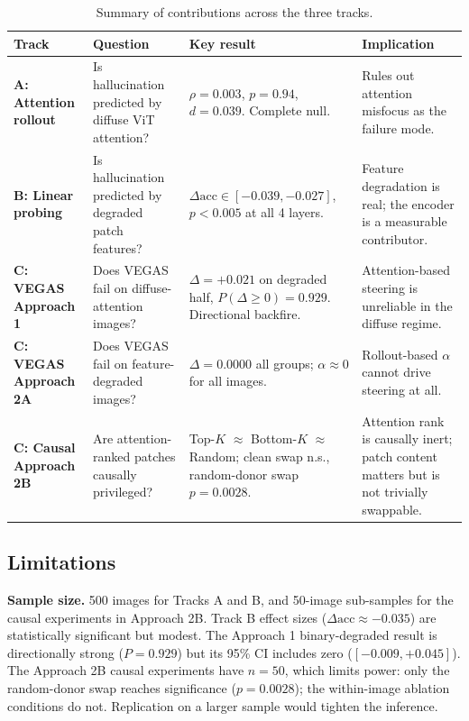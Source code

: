\documentclass[11pt]{article}
\begin{document}
\begin{table}[!ht]
\centering
\small
\caption{Summary of contributions across the three tracks.}
\label{tab:contributions}
\begin{tabular}{p{2.1cm}p{3.3cm}p{3.3cm}p{3.3cm}}
\toprule
\textbf{Track} & \textbf{Question} & \textbf{Key result} & \textbf{Implication} \\
\midrule
\textbf{A: Attention rollout}
  & Is hallucination predicted by diffuse ViT attention?
  & $\rho = 0.003$, $p = 0.94$, $d = 0.039$. Complete null.
  & Rules out attention misfocus as the failure mode. \\[4pt]
\textbf{B: Linear probing}
  & Is hallucination predicted by degraded patch features?
  & $\Delta\mathrm{acc} \in [-0.039, -0.027]$, $p < 0.005$ at all 4 layers.
  & Feature degradation is real; the encoder is a measurable contributor. \\[4pt]
\textbf{C: VEGAS Approach 1}
  & Does VEGAS fail on diffuse-attention images?
  & $\Delta = +0.021$ on degraded half, $P(\Delta \geq 0) = 0.929$. Directional
    backfire.
  & Attention-based steering is unreliable in the diffuse regime. \\[4pt]
\textbf{C: VEGAS Approach 2A}
  & Does VEGAS fail on feature-degraded images?
  & $\Delta = 0.0000$ all groups; $\alpha \approx 0$ for all images.
  & Rollout-based $\alpha$ cannot drive steering at all. \\[4pt]
\textbf{C: Causal Approach 2B}
  & Are attention-ranked patches causally privileged?
  & Top-$K$ $\approx$ Bottom-$K$ $\approx$ Random; clean swap n.s., random-donor swap
    $p = 0.0028$.
  & Attention rank is causally inert; patch content matters but is not trivially
    swappable. \\
\bottomrule
\end{tabular}
\end{table}

\subsection{Limitations}

\textbf{Sample size.} 500 images for Tracks A and B, and 50-image sub-samples for the
causal experiments in Approach 2B. Track B effect sizes
($\Delta\mathrm{acc} \approx -0.035$) are statistically significant but modest. The
Approach 1 binary-degraded result is directionally strong ($P = 0.929$) but its 95\%
CI includes zero ($[-0.009, +0.045]$). The Approach 2B causal experiments have
$n = 50$, which limits power: only the random-donor swap reaches significance
($p = 0.0028$); the within-image ablation conditions do not. Replication on a larger
sample would tighten the inference.
\end{document}
